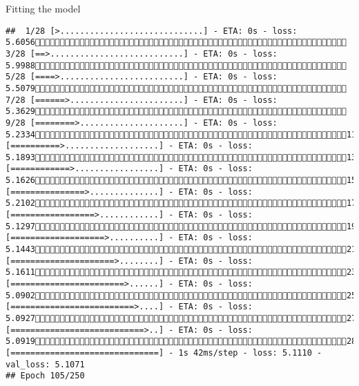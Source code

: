 \documentclass[
  ignorenonframetext,
]{beamer}
\begin{document}
\begin{frame}[fragile]{Fitting the model}
\begin{verbatim}
##  1/28 [>.............................] - ETA: 0s - loss: 5.6056 3/28 [==>...........................] - ETA: 0s - loss: 5.9988 5/28 [====>.........................] - ETA: 0s - loss: 5.5079 7/28 [======>.......................] - ETA: 0s - loss: 5.3629 9/28 [========>.....................] - ETA: 0s - loss: 5.233411/28 [==========>...................] - ETA: 0s - loss: 5.189313/28 [============>.................] - ETA: 0s - loss: 5.162615/28 [===============>..............] - ETA: 0s - loss: 5.210217/28 [=================>............] - ETA: 0s - loss: 5.129719/28 [===================>..........] - ETA: 0s - loss: 5.144321/28 [=====================>........] - ETA: 0s - loss: 5.161123/28 [=======================>......] - ETA: 0s - loss: 5.090225/28 [=========================>....] - ETA: 0s - loss: 5.092727/28 [===========================>..] - ETA: 0s - loss: 5.091928/28 [==============================] - 1s 42ms/step - loss: 5.1110 - val_loss: 5.1071
## Epoch 105/250

\end{verbatim}
\end{frame}
\end{document}

